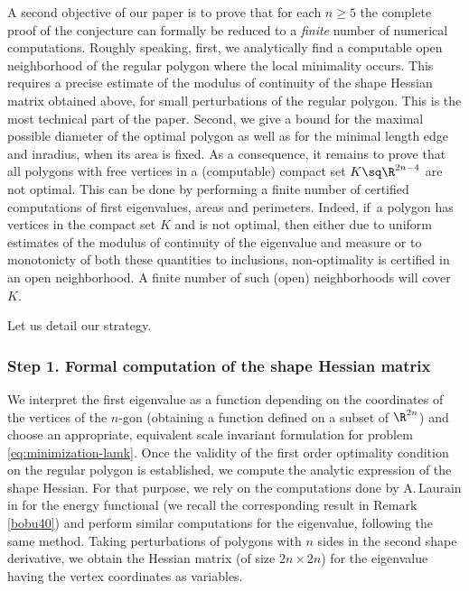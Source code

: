 A second objective of our paper is to prove that for each $n \ge 5$ the complete proof of the conjecture can formally be reduced to a {\it finite} number of numerical computations. Roughly speaking, first, we analytically
find a computable open neighborhood of the regular polygon where the {local} minimality occurs. This requires a precise estimate of the modulus of continuity of the shape Hessian matrix obtained above, for small perturbations of the regular polygon. This is the most technical part of the paper. Second, we give a bound for the maximal possible diameter of the optimal polygon as well as for the minimal length edge and inradius, when its area is fixed. As a consequence, {it remains} to prove that all polygons with free vertices in a (computable) compact set $K \sq \R^{2n-4}$ are not optimal. This can be done by performing a finite number of certified computations of first eigenvalues, areas and perimeters. Indeed, if~a polygon has vertices in the compact set $K$ and is not optimal, then either due to uniform estimates of the modulus of continuity of the eigenvalue and measure or to monotonicty of both these quantities to inclusions, non-optimality is certified in an open neighborhood. A finite number of such (open) neighborhoods will cover $K$. 

Let us detail our strategy.

\subsubsection*{Step 1. Formal computation of the shape Hessian matrix}
We interpret the first eigenvalue as a function depending on the coordinates of the vertices of the $n$-gon (obtaining a function defined on a subset of $\R^{2n}$) and choose an appropriate, equivalent scale invariant formulation for problem \eqref{eq:minimization-lamk}. Once the validity of the first order optimality condition on the regular polygon is established, we compute the analytic expression of the shape Hessian. For that purpose, we rely on the computations done by A.\,Laurain in \cite{laurain2ndDeriv} for the energy functional (we recall the corresponding result in Remark \ref{bobu40}) and perform similar computations for the eigenvalue, following the same method.
Taking perturbations of
polygons with $n$ sides in the second shape derivative, we obtain the Hessian matrix (of size $2n\times 2n$) for the eigenvalue having the vertex coordinates as variables.

